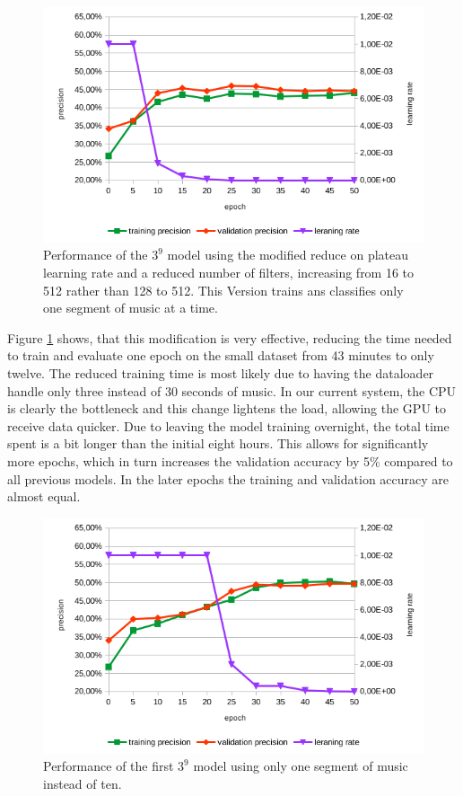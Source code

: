\begin{figure}[!htb]
	\centering
	\includegraphics[width=.9\linewidth]{images/sample-dcnn-m3-n9-seg1-16_512-plateau_mod.png}
	\caption{Performance of the $3^9$ model using the modified reduce on plateau learning rate and a reduced number of filters, increasing from 16 to 512 rather than 128 to 512. This Version trains ans classifies only one segment of music at a time.}
	\label{fig:sample-dcnn-m3-n9-seg1-16_512-plateau_mod}
\end{figure}

Figure \ref{fig:sample-dcnn-m3-n9-seg1-16_512-plateau_mod} shows, that this modification is very effective, reducing the time needed to train and evaluate one epoch on the small dataset from 43 minutes to only twelve. The reduced training time is most likely due to having the dataloader handle only three instead of 30 seconds of music. In our current system, the CPU is clearly the bottleneck and this change lightens the load, allowing the GPU to receive data quicker. Due to leaving the model training overnight, the total time spent is a bit longer than the initial eight hours. This allows for significantly more epochs, which in turn increases the validation accuracy by 5\% compared to all previous models. In the later epochs the training and validation accuracy are almost equal.

\begin{figure}[!htb]
	\centering
	\includegraphics[width=.9\linewidth]{images/sample-dcnn-m3-n9-seg1-128_512-plateau.png}
	\caption{Performance of the first $3^9$ model using only one segment of music instead of ten.}
	\label{fig:sample-dcnn-m3-n9-seg1-128_512-plateau}
\end{figure}

